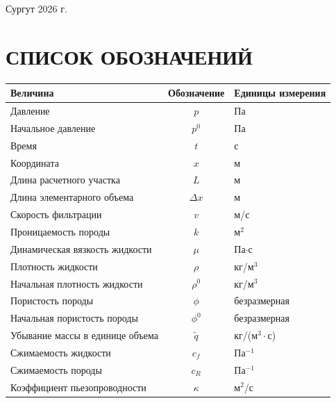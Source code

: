 \documentclass[12pt, a4paper]{article}
\begin{document}
\vfill %

\begin{center}
    Сургут 2026 г.
\end{center}

\newpage
\tableofcontents
\newpage

\section*{СПИСОК ОБОЗНАЧЕНИЙ}

\begin{table}[H]
    \centering
    \renewcommand{\arraystretch}{1.5} %
    \begin{tabular}{|>{\raggedright\arraybackslash}p{7cm}|c|>{\raggedright\arraybackslash}p{4cm}|}
        \hline
        \textbf{Величина} & \textbf{Обозначение} & \textbf{Единицы измерения} \\ \hline
        Давление & \(p\) & Па \\ \hline
        Начальное давление & \(p^0\) & Па \\ \hline
        Время & \(t\) & с \\ \hline
        Координата & \(x\) & м \\ \hline
        Длина расчетного участка & \(L\) & м \\ \hline
        Длина элементарного объема & \(\Delta x\) & м \\ \hline
        Скорость фильтрации & \(v\) & м/с \\ \hline
        Проницаемость породы & \(k\) & м\(^2\) \\ \hline
        Динамическая вязкость жидкости & \(\mu\) & Па\(\cdot\)с \\ \hline
        Плотность жидкости & \(\rho\) & кг/м\(^3\) \\ \hline
        Начальная плотность жидкости & \(\rho^0\) & кг/м\(^3\) \\ \hline
        Пористость породы & \(\phi\) & безразмерная \\ \hline
        Начальная пористость породы & \(\phi^0\) & безразмерная \\ \hline
        Убывание массы в единице объема & \(\tilde{q}\) & кг/(м\(^3\cdot\)с) \\ \hline
        Сжимаемость жидкости & \(c_f\) & Па\(^{-1}\) \\ \hline
        Сжимаемость породы & \(c_R\) & Па\(^{-1}\) \\ \hline
        Коэффициент пьезопроводности & \(\kappa\) & м\(^2\)/с \\ \hline
    \end{tabular}
\end{table}
\end{document}
